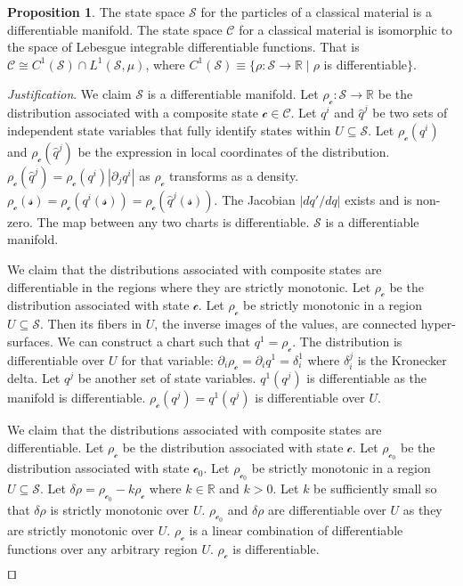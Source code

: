 \documentclass[smallextended]{svjour3}
\numberwithin{equation}{section}
\newenvironment{justification}{\emph{Justification}.}{\hfill\(\qed\)}
\theoremstyle{definition}
\newtheorem{prop}[equation]{Proposition}
\newenvironment{justification}{\emph{Justification}.}{\qed}
\begin{document}
\begin{prop}\label{prop:differentiable_manifold}
	The state space $\mathcal{S}$ for the particles of a  classical material is a differentiable manifold. The state space $\mathcal{C}$ for a classical material is isomorphic to the space of Lebesgue integrable differentiable functions. That is $\mathcal{C} \cong C^1(\mathcal{S}) \cap L^1(\mathcal{S}, \mu)$, where $C^1(\mathcal{S}) \equiv \{\rho:\mathcal{S} \rightarrow \mathbb{R} \; | \; \rho$ is differentiable$\}$.
\end{prop}
\begin{justification}
	We claim $\mathcal{S}$ is a differentiable manifold. Let $\rho_\mathcal{c} : \mathcal{S} \rightarrow \mathbb{R}$ be the distribution associated with a composite state $\mathcal{c} \in \mathcal{C}$. Let $q^i$ and $\hat{q}^j$ be two sets of independent state variables that fully identify states within $U\subseteq \mathcal{S}$. Let $\rho_\mathcal{c}(q^i)$ and $\rho_\mathcal{c}(\hat{q}^j)$ be the expression in local coordinates of the distribution.  $\rho_\mathcal{c}(\hat{q}^j)=\rho_\mathcal{c}(q^i) | \partial_j q^i |$ as $\rho_\mathcal{c}$ transforms as a density. $\rho_\mathcal{c}(\mathcal{s}) = \rho_\mathcal{c}(q^i(\mathcal{s})) = \rho_\mathcal{c}(\hat{q}^j(\mathcal{s}))$. The Jacobian $| d q' / d q |$ exists and is non-zero. The map between any two charts is differentiable. $\mathcal{S}$ is a differentiable manifold.
	
	We claim that the distributions associated with composite states are differentiable in the regions where they are strictly monotonic. Let $\rho_\mathcal{c}$ be the distribution associated with state $\mathcal{c}$. Let $\rho_\mathcal{c}$ be strictly monotonic in a region $U\subseteq \mathcal{S}$. Then its fibers in $U$, the inverse images of the values, are connected hyper-surfaces. We can construct a chart such that $q^1=\rho_\mathcal{c}$. The distribution is differentiable over $U$ for that variable: $\partial_{i} \rho_\mathcal{c} = \partial_{i} q^1 = \delta_i^1$ where $\delta_i^j$ is the Kronecker delta. Let $q^{j}$ be another set of state variables. $q^1(q^{j})$ is differentiable as the manifold is differentiable. $\rho_\mathcal{c}(q^{j})=q^1(q^{j})$ is differentiable over $U$.
	
	We claim that the distributions associated with composite states are differentiable. Let $\rho_\mathcal{c}$ be the distribution associated with state $\mathcal{c}$. Let $\rho_{\mathcal{c}_0}$ be the distribution associated with state $\mathcal{c}_0$. Let $\rho_{\mathcal{c}_0}$ be strictly monotonic in a region $U\subseteq \mathcal{S}$. Let $\delta \rho = \rho_{\mathcal{c}_0} - k \rho_{\mathcal{c}}$ where $k \in \mathbb{R}$ and $k>0$. Let $k$ be sufficiently small so that $\delta \rho$ is strictly monotonic over $U$. $\rho_{\mathcal{c}_0}$ and $\delta \rho$ are differentiable over $U$ as they are strictly monotonic over $U$. $\rho_{\mathcal{c}}$ is a linear combination of differentiable functions over any arbitrary region $U$. $\rho_{\mathcal{c}}$ is differentiable.
	

\end{justification}
\end{document}
